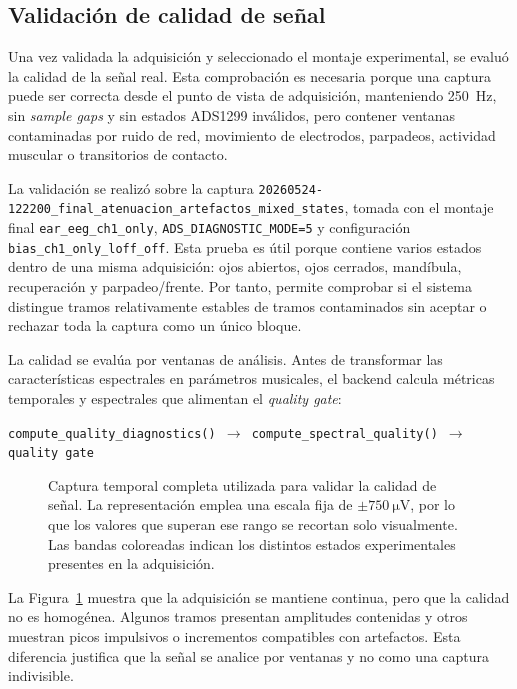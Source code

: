 \subsection{Validación de calidad de señal}
\label{subsec:validacion_calidad_senal}

Una vez validada la adquisición y seleccionado el montaje experimental, se evaluó la calidad de la señal real. Esta comprobación es necesaria porque una captura puede ser correcta desde el punto de vista de adquisición, manteniendo \SI{250}{\hertz}, sin \textit{sample gaps} y sin estados ADS1299 inválidos, pero contener ventanas contaminadas por ruido de red, movimiento de electrodos, parpadeos, actividad muscular o transitorios de contacto.

La validación se realizó sobre la captura \texttt{20260524-122200\_final\_atenuacion\_artefactos\_mixed\_states}, tomada con el montaje final \texttt{ear\_eeg\_ch1\_only}, \texttt{ADS\_DIAGNOSTIC\_MODE=5} y configuración \texttt{bias\_ch1\_only\_loff\_off}. Esta prueba es útil porque contiene varios estados dentro de una misma adquisición: ojos abiertos, ojos cerrados, mandíbula, recuperación y parpadeo/frente. Por tanto, permite comprobar si el sistema distingue tramos relativamente estables de tramos contaminados sin aceptar o rechazar toda la captura como un único bloque.

La calidad se evalúa por ventanas de análisis. Antes de transformar las características espectrales en parámetros musicales, el backend calcula métricas temporales y espectrales que alimentan el \textit{quality gate}:

\begin{center}
\texttt{compute\_quality\_diagnostics() $\rightarrow$ compute\_spectral\_quality() $\rightarrow$ quality gate}
\end{center}

\begin{figure}[!htbp]
    \centering
    \caption{Captura temporal completa utilizada para validar la calidad de señal. La representación emplea una escala fija de \(\pm\SI{750}{\micro\volt}\), por lo que los valores que superan ese rango se recortan solo visualmente. Las bandas coloreadas indican los distintos estados experimentales presentes en la adquisición.}
    \label{fig:validacion_mixed_states_temporal_global}
\end{figure}

La Figura~\ref{fig:validacion_mixed_states_temporal_global} muestra que la adquisición se mantiene continua, pero que la calidad no es homogénea. Algunos tramos presentan amplitudes contenidas y otros muestran picos impulsivos o incrementos compatibles con artefactos. Esta diferencia justifica que la señal se analice por ventanas y no como una captura indivisible.

